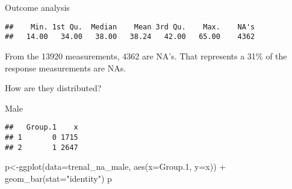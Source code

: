 \documentclass[
]{article}
\newenvironment{Shaded}{\begin{snugshade}}{\end{snugshade}}
\newcommand{\AttributeTok}[1]{\textcolor[rgb]{0.77,0.63,0.00}{#1}}
\newcommand{\FloatTok}[1]{\textcolor[rgb]{0.00,0.00,0.81}{#1}}
\newcommand{\FunctionTok}[1]{\textcolor[rgb]{0.00,0.00,0.00}{#1}}
\newcommand{\NormalTok}[1]{#1}
\newcommand{\OtherTok}[1]{\textcolor[rgb]{0.56,0.35,0.01}{#1}}
\newcommand{\SpecialCharTok}[1]{\textcolor[rgb]{0.00,0.00,0.00}{#1}}
\newcommand{\StringTok}[1]{\textcolor[rgb]{0.31,0.60,0.02}{#1}}
\begin{document}
Outcome analysis

\begin{Shaded}
\end{Shaded}

\begin{verbatim}
##    Min. 1st Qu.  Median    Mean 3rd Qu.    Max.    NA's 
##   14.00   34.00   38.00   38.24   42.00   65.00    4362
\end{verbatim}

From the 13920 measurements, 4362 are NA's. That represents a 31\% of
the response measurements are NAs.

How are they distributed?

Male

\begin{Shaded}
\end{Shaded}

\begin{verbatim}
##   Group.1    x
## 1       0 1715
## 2       1 2647
\end{verbatim}

\begin{Shaded}
\begin{Highlighting}[]
\NormalTok{p}\OtherTok{\textless{}{-}}\FunctionTok{ggplot}\NormalTok{(}\AttributeTok{data=}\NormalTok{trenal\_na\_male, }\FunctionTok{aes}\NormalTok{(}\AttributeTok{x=}\NormalTok{Group}\FloatTok{.1}\NormalTok{, }\AttributeTok{y=}\NormalTok{x)) }\SpecialCharTok{+}
  \FunctionTok{geom\_bar}\NormalTok{(}\AttributeTok{stat=}\StringTok{"identity"}\NormalTok{)}
\NormalTok{p}
\end{Highlighting}
\end{Shaded}
\end{document}

